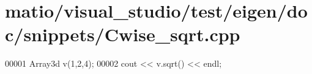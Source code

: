 \hypertarget{matio_2visual__studio_2test_2eigen_2doc_2snippets_2_cwise__sqrt_8cpp_source}{}\section{matio/visual\+\_\+studio/test/eigen/doc/snippets/\+Cwise\+\_\+sqrt.cpp}
\label{matio_2visual__studio_2test_2eigen_2doc_2snippets_2_cwise__sqrt_8cpp_source}

\begin{DoxyCode}
00001 Array3d v(1,2,4);
00002 cout << v.sqrt() << endl;
\end{DoxyCode}
